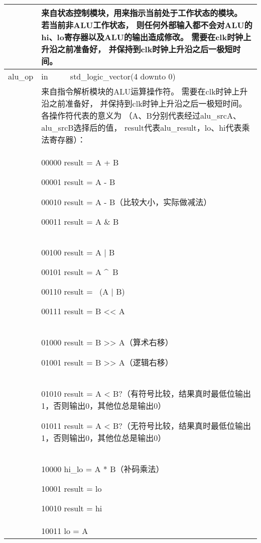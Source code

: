 \begin{tabularx}{\textwidth}{lll}
            \cmidrule(l){2-3}
            &
            \multicolumn{2}{X}{
            来自状态控制模块，用来指示当前处于工作状态的模块。%
            若当前非ALU工作状态，%
            则任何外部输入都不会对ALU的hi、lo寄存器以及ALU的输出造成修改。%
            需要在clk时钟上升沿之前准备好，%
            并保持到clk时钟上升沿之后一极短时间。} \\
            \midrule
            alu\_op         & in       & std\_logic\_vector(4 downto 0) \\
            \cmidrule(l){2-3}
            &
            \multicolumn{2}{X}{
            来自指令解析模块的ALU运算操作符。%
            需要在clk时钟上升沿之前准备好，%
            并保持到clk时钟上升沿之后一极短时间。%
            各操作符代表的意义为%
            （A、B分别代表经过alu\_srcA、alu\_srcB选择后的值，%
            result代表alu\_result，lo、hi代表乘法寄存器）：%
            } \\
            &
            \multicolumn{2}{X}{
            00000 result = A + B

            00001 result = A - B

            00010 result = A - B（比较大小，实际做减法）

            00011 result = A \& B
            } \\
            &
            \multicolumn{2}{X}{
            00100 result = A | B

            00101 result = A \textasciicircum \ B

            00110 result = ~(A | B)

            00111 result = B << A
            } \\
            &
            \multicolumn{2}{X}{
            01000 result = B >> A（算术右移）

            01001 result = B >> A（逻辑右移）
            } \\
            &
            \multicolumn{2}{X}{
            01010 result = A < B?（有符号比较，结果真时最低位输出1，否则输出0，其他位总是输出0）

            01011 result = A < B?（无符号比较，结果真时最低位输出1，否则输出0，其他位总是输出0）
            } \\
            &
            \multicolumn{2}{X}{
            10000 hi\_lo = A * B（补码乘法）

            10001 result = lo

            10010 result = hi
            } \\
            &
            \multicolumn{2}{X}{
            10011 lo = A

}
\end{tabularx}
